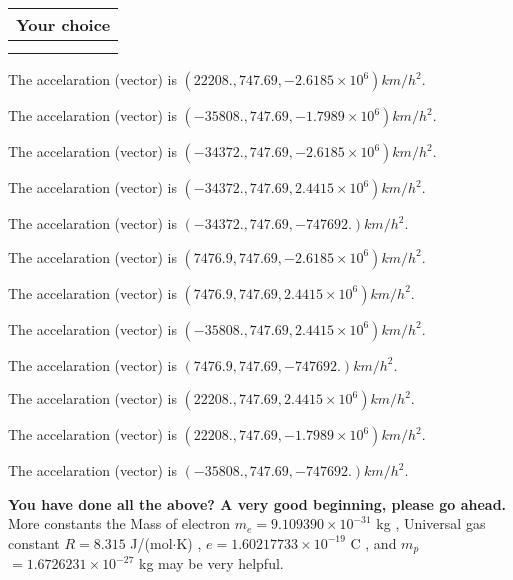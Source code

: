 \documentclass[12pt]{article}
\begin{document}
  
  
\noindent\hspace{3.0in} \begin{tabular}{|l|}
\hline
Your choice \\
\hline
 \\ 
 \\ 
\hline
\end{tabular}
  
  
 
 
The accelaration (vector) is
$(
22208.,
747.69 ,
-2.6185 \times 10^{6}
)km/h^2.
$
 
 
The accelaration (vector) is
$(
-35808.,
747.69 ,
-1.7989 \times 10^{6}
)km/h^2.
$
 
 
The accelaration (vector) is
$(
-34372.,
747.69 ,
-2.6185 \times 10^{6}
)km/h^2.
$
 
 
The accelaration (vector) is
$(
-34372.,
747.69 ,
2.4415 \times 10^{6}
)km/h^2.
$
 
 
The accelaration (vector) is
$(
-34372.,
747.69 ,
-747692.
)km/h^2.
$
 
 
The accelaration (vector) is
$(
7476.9,
747.69 ,
-2.6185 \times 10^{6}
)km/h^2.
$
 
 
The accelaration (vector) is
$(
7476.9,
747.69 ,
2.4415 \times 10^{6}
)km/h^2.
$
 
 
The accelaration (vector) is
$(
-35808.,
747.69 ,
2.4415 \times 10^{6}
)km/h^2.
$
 
 
The accelaration (vector) is
$(
7476.9,
747.69 ,
-747692.
)km/h^2.
$
 
 
The accelaration (vector) is
$(
22208.,
747.69 ,
2.4415 \times 10^{6}
)km/h^2.
$
 
 
The accelaration (vector) is
$(
22208.,
747.69 ,
-1.7989 \times 10^{6}
)km/h^2.
$
 
 
The accelaration (vector) is
$(
-35808.,
747.69 ,
-747692.
)km/h^2.
$
 
 
 
 

 
 
\vspace{0.3in}
   
   
\vspace{0.3in}
{\textbf{\LARGE{You have done all the above? A very good beginning, please go ahead.}}}
More constants the
Mass of electron
$m_e$$ =
9.109390 \times 10^{-31} $
kg
,
Universal gas constant
$R$$ =
8.315 $
J/(mol$\cdot $K)
,
$e$$ =
1.60217733 \times 10^{-19} $
C
, and
$m_p$$ =
1.6726231 \times 10^{-27} $
kg
%
may be very helpful.
\vspace{0.3in}
   
\end{document}
